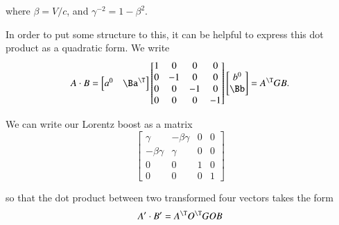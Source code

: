 where \(\beta = V/c\), and \(\gamma^{-2} = 1 - \beta^2\).

In order to put some structure to this, it can be helpful to express this dot product as a quadratic form.  We write
%
\begin{equation}\label{eqn:relativisticElectrodynamicsT1:100}
\begin{aligned}
A \cdot B =
\begin{bmatrix}
a^0 & \Ba^\T
\end{bmatrix}
\begin{bmatrix}
1 & 0 & 0 & 0 \\
0 & -1 & 0 & 0 \\
0 & 0 & -1 & 0 \\
0 & 0 & 0 & -1
\end{bmatrix}
\begin{bmatrix}
b^0 \\
\Bb
\end{bmatrix}
= A^\T G B.
\end{aligned}
\end{equation}

We can write our Lorentz boost as a matrix
%
\begin{equation}\label{eqn:relativisticElectrodynamicsT1:110}
\begin{bmatrix}
\gamma & -\beta \gamma & 0 & 0 \\
-\beta \gamma & \gamma & 0 & 0 \\
0 & 0 & 1 & 0 \\
0 & 0 & 0 & 1
\end{bmatrix}
\end{equation}

so that the dot product between two transformed four vectors takes the form
%
\begin{equation}\label{eqn:relativisticElectrodynamicsT1:120}
A' \cdot B' = A^\T O^\T G O B
\end{equation}
